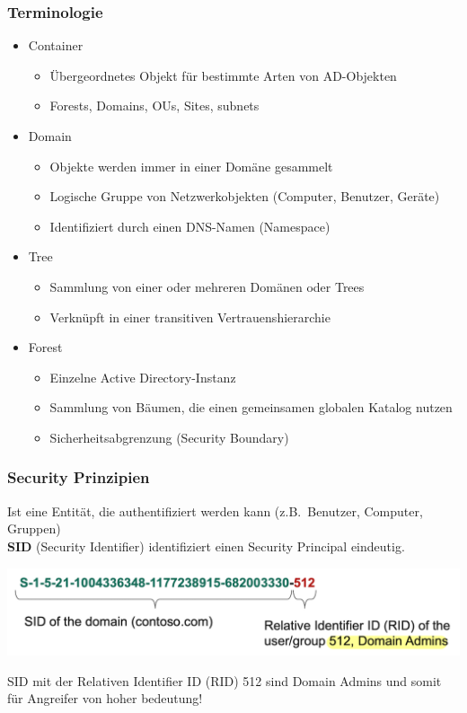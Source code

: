 \subsubsection{Terminologie}
\begin{itemize}
    \item Container
    \begin{itemize}
        \item Übergeordnetes Objekt für bestimmte Arten von AD-Objekten
        \item Forests, Domains, OUs, Sites, subnets
    \end{itemize}
    \item Domain
    \begin{itemize}
        \item Objekte werden immer in einer Domäne gesammelt
        \item Logische Gruppe von Netzwerkobjekten (Computer, Benutzer, Geräte)
        \item Identifiziert durch einen DNS-Namen (Namespace)
    \end{itemize}
    \item Tree
    \begin{itemize}
        \item Sammlung von einer oder mehreren Domänen oder Trees
        \item Verknüpft in einer transitiven Vertrauenshierarchie
    \end{itemize}
    \item Forest
    \begin{itemize}
        \item Einzelne Active Directory-Instanz
        \item Sammlung von Bäumen, die einen gemeinsamen globalen Katalog nutzen
        \item Sicherheitsabgrenzung (Security Boundary)
    \end{itemize}
\end{itemize}

\subsubsection{Security Prinzipien}
Ist eine Entität, die authentifiziert werden kann (z.B.\ Benutzer, Computer, Gruppen)\\
\textbf{SID} (Security Identifier) identifiziert einen Security Principal eindeutig.\\
\begin{center}
    \vspace{-8pt}
    \includegraphics[width=.7\linewidth]{./img/03-active_directory/sid}
    \vspace{-8pt}
\end{center}
SID mit der Relativen Identifier ID (RID) 512 sind Domain Admins und somit für Angreifer von hoher bedeutung!

